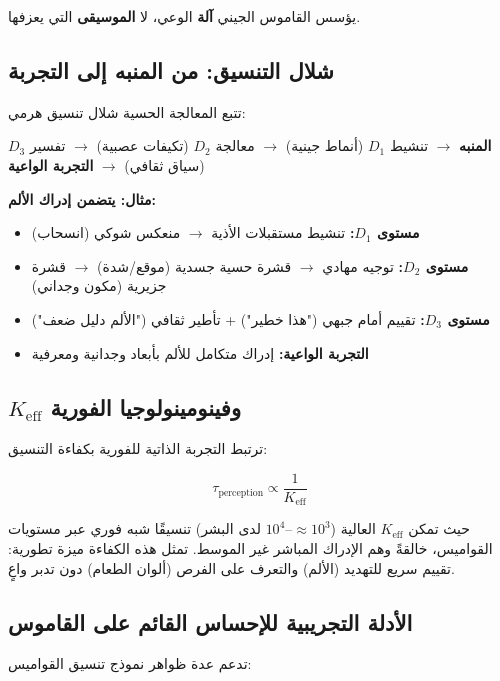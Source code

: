 \documentclass[12pt,a4paper]{article}
\newcommand{\eff}{\mathrm{eff}}
\newcommand{\Ke}{K_{\eff}}
\begin{document}
	يؤسس القاموس الجيني \textbf{آلة} الوعي، لا \textbf{الموسيقى} التي يعزفها.
	
	\subsection{شلال التنسيق: من المنبه إلى التجربة}
	
	تتبع المعالجة الحسية شلال تنسيق هرمي:
	
	\begin{center}
		\textbf{المنبه} \(\rightarrow\) تنشيط \(D_1\) (أنماط جينية) \(\rightarrow\) معالجة \(D_2\) (تكيفات عصبية) \(\rightarrow\) تفسير \(D_3\) (سياق ثقافي) \(\rightarrow\) \textbf{التجربة الواعية}
	\end{center}
	
	\textbf{مثال: يتضمن إدراك الألم:}
	\begin{itemize}
		\item \textbf{مستوى \(D_1\):} تنشيط مستقبلات الأذية \(\rightarrow\) منعكس شوكي (انسحاب)
		\item \textbf{مستوى \(D_2\):} توجيه مهادي \(\rightarrow\) قشرة حسية جسدية (موقع/شدة) \(\rightarrow\) قشرة جزيرية (مكون وجداني)
		\item \textbf{مستوى \(D_3\):} تقييم أمام جبهي ("هذا خطير") + تأطير ثقافي ("الألم دليل ضعف")
		\item \textbf{التجربة الواعية:} إدراك متكامل للألم بأبعاد وجدانية ومعرفية
	\end{itemize}
	
	\subsection{\(\Ke\) وفينومينولوجيا الفورية}
	
	ترتبط التجربة الذاتية للفورية بكفاءة التنسيق:
	
	\[
	\tau_{\text{perception}} \propto \frac{1}{\Ke}
	\]
	
	حيث تمكن \(\Ke\) العالية (\(\approx 10^3\)--\(10^4\) لدى البشر) تنسيقًا شبه فوري عبر مستويات القواميس، خالقةً وهم الإدراك المباشر غير الموسط. تمثل هذه الكفاءة ميزة تطورية: تقييم سريع للتهديد (الألم) والتعرف على الفرص (ألوان الطعام) دون تدبر واعٍ.
	
	\subsection{الأدلة التجريبية للإحساس القائم على القاموس}
	
	تدعم عدة ظواهر نموذج تنسيق القواميس:
	
\end{document}
